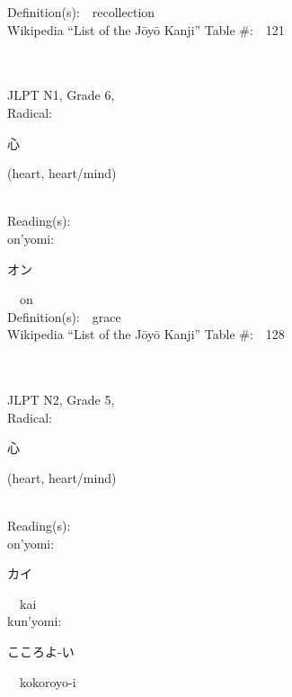 \begin{multicols}{2}
Definition(s):\ \ recollection \\
Wikipedia ``List of the J\=oy\=o Kanji'' Table \#:\ \ 121 \\
\ \ \\
{\fontsize{34pt}{40pt}  }\ \ \\  %
{JLPT N1, Grade 6, \\Radical:\ \ {\begin{CJK}{UTF8}{min} 心 \end{CJK}} (heart, heart/mind) } \\
Reading(s):\ \ \\
{\hspace*{1em}}on'yomi:\ \ \\
{\hspace*{2em}}{\begin{CJK}{UTF8}{min} オン \end{CJK}}\ \ on\ \ \\
Definition(s):\ \ grace \\
Wikipedia ``List of the J\=oy\=o Kanji'' Table \#:\ \ 128 \\
\ \ \\
{\fontsize{34pt}{40pt}  }\ \ \\  %
{JLPT N2, Grade 5, \\Radical:\ \ {\begin{CJK}{UTF8}{min} 心 \end{CJK}} (heart, heart/mind) } \\
Reading(s):\ \ \\
{\hspace*{1em}}on'yomi:\ \ \\
{\hspace*{2em}}{\begin{CJK}{UTF8}{min} カイ \end{CJK}}\ \ kai\ \ \\
{\hspace*{1em}}kun'yomi:\ \ \\
{\hspace*{2em}}{\begin{CJK}{UTF8}{min} こころよ-い \end{CJK}}\ \ kokoroyo-i\ \ \\

\end{multicols}
